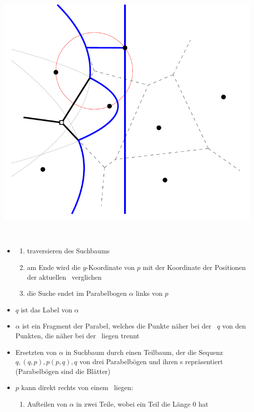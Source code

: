 \begin{itemize}
\begin{description}
\begin{description}
\begin{description}
\begin{minipage}{0.3\textwidth}
									\includegraphics[width=\textwidth]{Pics/8_siteevent.png}
								\end{minipage}\\
								\begin{itemize}
									\item[] \begin{enumerate}
											\item traversieren des Suchbaums
											\item am Ende wird die $y$-Koordinate von $p$ mit der Koordinate der Positionen der aktuellen \bpoint~verglichen
											\item die Suche endet im Parabelbogen $\alpha$ links von $p$
										\end{enumerate}
									\item $q$ ist das Label von $\alpha$
									\item $\alpha$ ist ein Fragment der Parabel, welches die Punkte näher bei der \site~$q$ von den Punkten, die näher bei der \sweep~liegen trennt
									\item Ersetzten von $\alpha$ in Suchbaum durch einen Teilbaum, der die Sequenz $q,(q,p),p(p,q),q$ von drei Parabelbögen und ihren \bpoint s repräsentiert (Parabelbögen sind die Blätter)
									\item $p$ kann direkt rechts von einem \bpoint~liegen:
										\begin{enumerate}
											\item Aufteilen von $\alpha$ in zwei Teile, wobei ein Teil die Länge $0$ hat

\end{enumerate}
\end{itemize}
\end{description}
\end{description}
\end{description}
\end{itemize}
